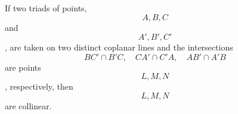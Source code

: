 If two triads of points, $$A, B, C$$ and $$A', B', C'$$, are taken on two distinct coplanar lines and the intersections
$$BC' \cap B'C,\quad CA' \cap C'A,\quad AB' \cap A'B$$
are points $$L, M, N$$, respectively, then $$L, M, N$$ are collinear.
